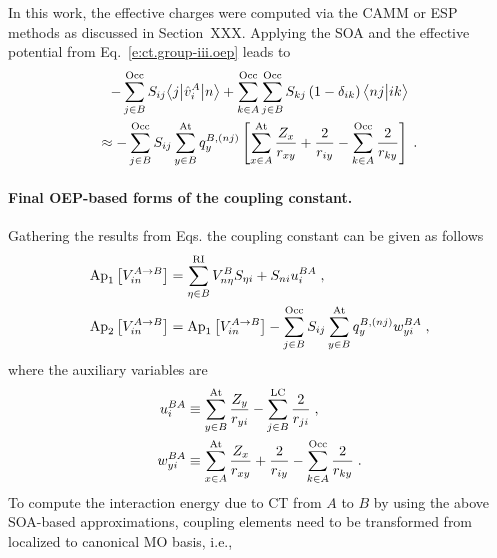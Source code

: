 %
In this work, the effective charges were computed via the CAMM or ESP methods as
discussed in Section~XXX. Applying the SOA 
and the effective potential from Eq.~\eqref{e:ct.group-iii.oep} 
leads to 
%
\begin{multline} \label{e:ct.group-iii.final.b}
        - \sum_{j\in B}^{\rm Occ} S_{ij} \bigl\langle {j} \bigl\lvert {\hat{v}^A_{i} } \bigl\lvert {n} \bigr\rangle  
     + \sum_{k\in A}^{\rm Occ} \sum_{j\in B}^{\rm Occ}  
        S_{kj} \left( 1 - \delta_{ik} \right) 
        \bigl\langle {nj} \bigl\lvert {ik} \bigr\rangle  \\
 \approx  -
 \sum_{j\in B}^{\rm Occ} S_{ij}
 \sum_{y\in B}^{\rm At} 
 q^{B,(nj)}_{y} 
 \left[ 
   \sum_{x\in A}^{\rm At}
   \frac{Z_x}{r_{xy}}
  + \frac{2}{r_{iy}}
  - \sum_{k\in A}^{\rm Occ}
    \frac{2}{r_{ky}} 
 \right]
 \;.
\end{multline}
%


\paragraph{Final OEP-based forms of the coupling constant.}
Gathering the results from Eqs. the coupling constant
can be given as follows
%
\begin{subequations}
\begin{align} \label{e:ct-murell-etal.vin.oep}
\Approx{ V_{in}^{A\rightarrow B} }{1}
       &= \sum_{\eta\in B}^{\rm RI} V^B_{n\eta} S_{\eta i} 
 +
S_{ni} u_i^{BA} \;, \\
%
\Approx{ V_{in}^{A\rightarrow B} }{2} &=
\Approx{ V_{in}^{A\rightarrow B} }{1} -
  \sum_{j   \in B}^{\rm Occ} S_{ij}
  \sum_{y   \in B}^{\rm At} q_y^{B,(nj)} w_{yi}^{BA}
\;,
\end{align}
\end{subequations}
%
where the auxiliary variables are
%
\begin{subequations}
\begin{align} \label{e:ct-murell-etal.vin.oep.aux-var}
 u_i^{BA} &\equiv    
 \sum_{y\in B}^{\rm At}
  \frac{Z_y}{ r_{yi} } 
 -
 \sum_{j\in B}^{\rm LC}
  \frac{2}{r_{ji}} 
                \;, \\
 w_{yi}^{BA} &\equiv 
   \sum_{x\in A}^{\rm At}
   \frac{Z_x}{r_{xy}}
  + \frac{2}{r_{iy}}
  - \sum_{k\in A}^{\rm Occ}
    \frac{2}{r_{ky}} 
                \;.
\end{align}
\end{subequations}
%
To compute the interaction energy due to CT from $A$ to $B$ by using the above SOA\hyp{}based
approximations, coupling elements need to be transformed from localized to canonical MO basis, i.e.,
